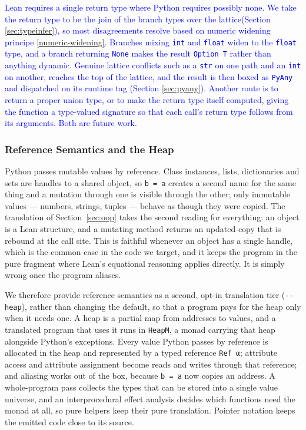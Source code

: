 \documentclass{article}
\newcommand{\code}{\lstinline}
\newcommand{\suggest}[1]{\textcolor{blue}{#1}}
\begin{document}
\suggest{Lean requires a single return type where Python requires possibly none. We take the return type to be the join of the branch types over the lattice(Section \ref{sec:typeinfer}), so most disagreements resolve based on numeric widening principe \ref{numeric-widening}. Branches mixing \code{int} and \code{float} widen to the \code{float} type, and a branch returning \code{None} makes the result \code{Option T} rather than anything dynamic. Genuine lattice conflicts such as a \code{str} on one path and an \code{int} on another, reaches the top of the lattice, and the result is then boxed as \code{PyAny} and dispatched on its runtime tag (Section \ref{sec:pyany}). Another route is to return a proper union type, or to make the return type itself computed, giving the function a type-valued signature so that each call's return type follows from its arguments. Both are future work.}

\subsubsection{Reference Semantics and the Heap}\label{sec:heap}
Python passes mutable values by reference. Class instances, lists, dictionaries and sets are handles to
a shared object, so \code{b = a} creates a second name for the same thing and a mutation through one is
visible through the other; only immutable values --- numbers, strings, tuples --- behave as though they
were copied. The translation of Section~\ref{sec:oop} takes the second reading for everything: an
object is a Lean structure, and a mutating method returns an updated copy that is rebound at the call
site. This is faithful whenever an object has a single handle, which is the common case in the code we
target, and it keeps the program in the pure fragment where Lean's equational reasoning applies
directly. It is simply wrong once the program aliases.

We therefore provide reference semantics as a second, opt-in translation tier (\code{--heap}), rather
than changing the default, so that a program pays for the heap only when it needs one. A heap is a
partial map from addresses to values, and a translated program that uses it runs in \code{HeapM}, a
monad carrying that heap alongside Python's exceptions. Every value Python passes by reference is
allocated in the heap and represented by a typed reference \code{Ref α}; attribute access and attribute
assignment become reads and writes through that reference; and aliasing works out of the box, because
\code{b = a} now copies an address. A whole-program pass collects the types that can be stored into a
single value universe, and an interprocedural effect analysis decides which functions need the monad
at all, so pure helpers keep their pure translation. Pointer notation keeps the emitted code close to
its source.
\end{document}

